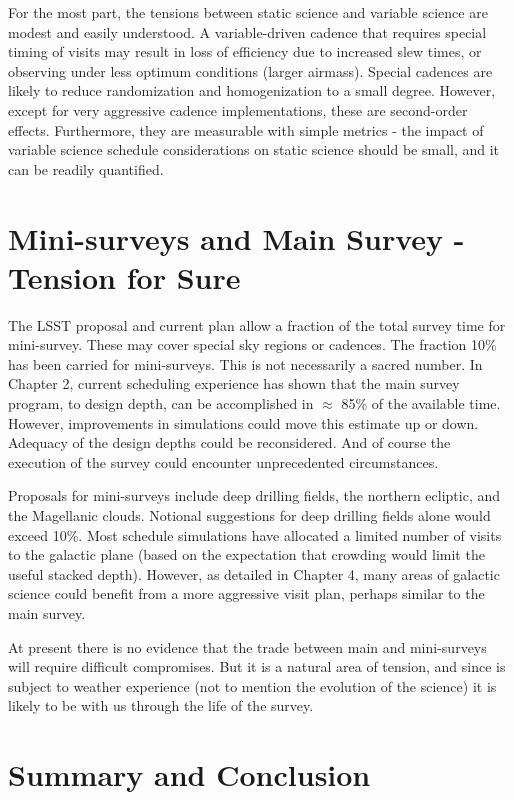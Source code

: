 For the most part, the tensions between static science and variable science are modest and easily understood.  A variable-driven cadence that requires special timing of visits may result in loss of efficiency due to increased slew times, or observing under less optimum conditions (larger airmass).  Special cadences are likely to reduce randomization and homogenization to a small degree. However, except for very aggressive cadence implementations, these are second-order effects.  Furthermore, they are measurable with simple metrics - the impact of variable science schedule considerations on static science should be small, and it can be readily quantified.

\section{Mini-surveys and Main Survey - Tension for Sure}

The LSST proposal and current plan allow a fraction of the total survey time for mini-survey. These may cover special sky regions or cadences.  The fraction 10\% has been carried for mini-surveys.  This is not necessarily a sacred number. In Chapter 2, current scheduling experience has shown that the main survey program, to design depth, can be accomplished in $\approx$ 85\% of the available time. However, improvements in simulations could move this estimate up or down. Adequacy of the design depths could be reconsidered.  And of course the execution of the survey could encounter unprecedented circumstances.

Proposals for mini-surveys include deep drilling fields, the northern ecliptic, and the Magellanic clouds. Notional suggestions for deep drilling fields alone would exceed 10\%.   Most schedule simulations have allocated a limited number of visits to the galactic plane (based on the expectation that crowding would limit the useful stacked depth).  However, as detailed in Chapter 4, many areas of galactic science could benefit from a more aggressive visit plan, perhaps similar to the main survey.

At present there is no evidence that the trade between main and mini-surveys will require difficult compromises.  But it is a natural area of tension, and since is subject to weather experience (not to mention the evolution of the science) it is likely to be with us through the life of the survey.

\section{Summary and Conclusion}

